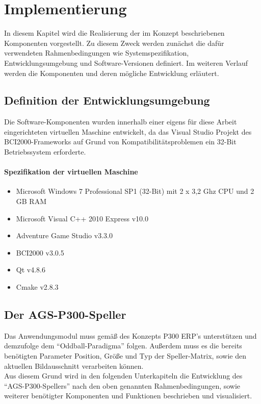\chapter{Implementierung}

In diesem Kapitel wird die Realisierung der im Konzept beschriebenen Komponenten vorgestellt.
Zu diesem Zweck werden zunächst die dafür verwendeten Rahmenbedingungen wie Systemspezifikation, Entwicklungsumgebung und Software-Versionen definiert.
Im weiteren Verlauf werden die Komponenten und deren mögliche Entwicklung erläutert.

\section{Definition der Entwicklungsumgebung}
Die Software-Komponenten wurden innerhalb einer eigens für diese Arbeit eingerichteten virtuellen Maschine entwickelt, 
da das Visual Studio Projekt des \acs{BCI2000}-Frameworks auf Grund von Kompatibilitätsproblemen ein 32-Bit Betriebssystem erforderte.

\subsubsection{Spezifikation der virtuellen Maschine}
\begin{itemize}
\setlength{\itemsep}{0pt}
\item Microsoft Windows 7 Professional SP1 (32-Bit) mit 2 x 3,2 Ghz CPU und 2 GB RAM
\item Microsoft Visual C++ 2010 Express v10.0
\item Adventure Game Studio v3.3.0
\item BCI2000 v3.0.5
\item Qt v4.8.6
\item Cmake v2.8.3
\end{itemize}








\pagebreak
\section{Der \acs{AGS}-P300-Speller}

Das Anwendungsmodul muss gemäß des Konzepts \acs{P300 ERP}'s unterstützen und demzufolge dem "`Oddball-Paradigma"' folgen.
Außerdem muss es die bereits benötigten Parameter Position, Größe und Typ der Speller-Matrix, sowie den aktuellen Bildausschnitt verarbeiten können.\\
Aus diesem Grund wird in den folgenden Unterkapiteln die Entwicklung des "`AGS-P300-Spellers"' nach den oben genannten Rahmenbedingungen, sowie weiterer benötigter Komponenten und Funktionen beschrieben und visualisiert.

